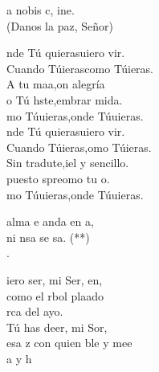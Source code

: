 \documentclass[12pt]{article}
\begin{document}
\begin{multicols*}{2}
\begin{cancion}%
	a nobis c, ine.\\
(Danos la paz, Señor)\\
\end{cancion}%

\begin{cancion}%
	nde Tú quierasuiero vir.\\
	Cuando Túierascomo Túieras. \\
	A tu maa,on alegría\\
	o Tú hste,embrar mida.\\
	mo Túuieras,onde Túuieras. \\
	nde Tú quierasuiero vir.\\
	Cuando Túieras,omo Túieras. \\
	Sin tradute,iel y sencillo.\\
	puesto spreomo tu o.\\
	mo Túuieras,onde Túuieras.\\
\end{cancion}%

\begin{cancion}%
	alma e anda en a,\\
	ni nsa  se sa. (**)\\
	.     \\
\end{cancion}%

\begin{cancion}%
	iero ser, mi Ser, en,\\
	como el rbol plaado\\
	rca del ayo.\\
	Tú has deer, mi Sor,\\
	esa z con quien ble y mee\\
	a y h \\
\end{cancion}%


\end{multicols*}
\end{document}
